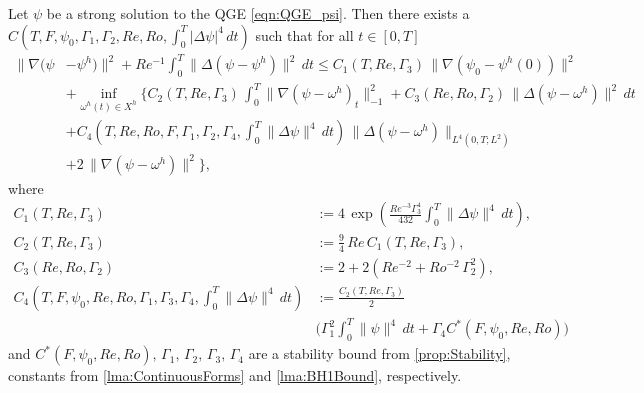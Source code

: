 \begin{thm} \label{thm:StrongConvergence}
  Let $\psi$ be a strong solution to the QGE \eqref{eqn:QGE_psi}. Then there
  exists a \\ $C(T, F, \psi_0, \Gamma_1, \Gamma_2, Re, Ro,\int_0^T\! |\Delta
  \psi|^4\, dt)$ such that for all $t\in [0,T]$
  \begin{equation}
    \begin{split}
      \|\nabla (\psi &- \psi^h) \|^2 + Re^{-1}
        \int_{0}^{T}\! \|\Delta (\psi - \psi^h)\|^2 \, dt
        \le C_1(T,Re,\Gamma_3)\,\|\nabla(\psi_0 - \psi^h(0))\|^2 \\
      & + \inf_{\omega^h(t) \in X^h} \biggl\{
        C_2(T,Re,\Gamma_3)\,\int_0^T\! \|\nabla(\psi - \omega^h)_t\|^2_{-1}
        + C_3(Re,Ro,\Gamma_2)\, \|\Delta(\psi - \omega^h)\|^2\, dt \\
      & + C_4(T,Re,Ro,F,\Gamma_1,\Gamma_2,\Gamma_4, \int_{0}^{T}\!\|\Delta
        \psi\|^4\, dt)\,\|\Delta(\psi - \omega^h)\|_{L^4(0,T;L^2)} \\
      & + 2\,\|\nabla (\psi - \omega^h)\|^2\biggr\},
    \end{split}
    \label{eqn:StrongConvergence}
  \end{equation}
  where
  \begin{align}
    C_1(T,Re,\Gamma_3) &:= 4\, \exp\left(\frac{Re^{-3} \Gamma_3^4}{432}
      \int_{0}^{T}\! \|\Delta \psi\|^4\, dt\right), \label{eqn:C1}\\
    C_2(T,Re,\Gamma_3) &:= \frac{9}{4}\, Re\, C_1(T,Re,\Gamma_3), \label{eqn:C2}\\
    C_3(Re,Ro,\Gamma_2) &:= 2 + 2\left(Re^{-2} + Ro^{-2}\, \Gamma_2^2\right), \label{eqn:C3} \\
    C_4(T,F,\psi_0,Re,Ro,\Gamma_1,\Gamma_3,\Gamma_4,\int_{0}^{T}\! \|\Delta
    \psi\|^4\, dt) &:= \frac{C_2(T,Re,\Gamma_3)}{2} \\
      & \biggl(\Gamma_1^2 \int_{0}^{T}\! \|\psi\|^4\, dt + \Gamma_4
        C^*(F,\psi_0,Re,Ro)\biggr) \label{eqn:C4}
  \end{align}
  and $C^*(F,\psi_0,Re,Ro),\, \Gamma_1,\, \Gamma_2,\, \Gamma_3,\, \Gamma_4$ are
  a stability bound from \autoref{prop:Stability}, constants from
  \autoref{lma:ContinuousForms} and \autoref{lma:BH1Bound}, respectively.
\end{thm}
